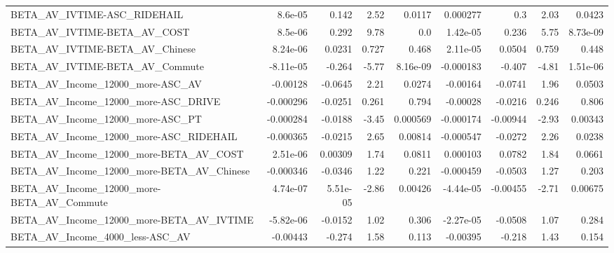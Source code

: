 \begin{tabular}{lrrrrrrrr}
BETA\_AV\_IVTIME-ASC\_RIDEHAIL                        &     8.6e-05 &        0.142 &     2.52 &   0.0117 &   0.000277 &         0.3 &         2.03 &        0.0423 \\
BETA\_AV\_IVTIME-BETA\_AV\_COST                        &     8.5e-06 &        0.292 &     9.78 &      0.0 &   1.42e-05 &       0.236 &         5.75 &      8.73e-09 \\
BETA\_AV\_IVTIME-BETA\_AV\_Chinese                     &    8.24e-06 &       0.0231 &    0.727 &    0.468 &   2.11e-05 &      0.0504 &        0.759 &         0.448 \\
BETA\_AV\_IVTIME-BETA\_AV\_Commute                     &   -8.11e-05 &       -0.264 &    -5.77 & 8.16e-09 &  -0.000183 &      -0.407 &        -4.81 &      1.51e-06 \\
BETA\_AV\_Income\_12000\_more-ASC\_AV                   &    -0.00128 &      -0.0645 &     2.21 &   0.0274 &   -0.00164 &     -0.0741 &         1.96 &        0.0503 \\
BETA\_AV\_Income\_12000\_more-ASC\_DRIVE                &   -0.000296 &      -0.0251 &    0.261 &    0.794 &   -0.00028 &     -0.0216 &        0.246 &         0.806 \\
BETA\_AV\_Income\_12000\_more-ASC\_PT                   &   -0.000284 &      -0.0188 &    -3.45 & 0.000569 &  -0.000174 &    -0.00944 &        -2.93 &       0.00343 \\
BETA\_AV\_Income\_12000\_more-ASC\_RIDEHAIL             &   -0.000365 &      -0.0215 &     2.65 &  0.00814 &  -0.000547 &     -0.0272 &         2.26 &        0.0238 \\
BETA\_AV\_Income\_12000\_more-BETA\_AV\_COST             &    2.51e-06 &      0.00309 &     1.74 &   0.0811 &   0.000103 &      0.0782 &         1.84 &        0.0661 \\
BETA\_AV\_Income\_12000\_more-BETA\_AV\_Chinese          &   -0.000346 &      -0.0346 &     1.22 &    0.221 &  -0.000459 &     -0.0503 &         1.27 &         0.203 \\
BETA\_AV\_Income\_12000\_more-BETA\_AV\_Commute          &    4.74e-07 &     5.51e-05 &    -2.86 &  0.00426 &  -4.44e-05 &    -0.00455 &        -2.71 &       0.00675 \\
BETA\_AV\_Income\_12000\_more-BETA\_AV\_IVTIME           &   -5.82e-06 &      -0.0152 &     1.02 &    0.306 &  -2.27e-05 &     -0.0508 &         1.07 &         0.284 \\
BETA\_AV\_Income\_4000\_less-ASC\_AV                    &    -0.00443 &       -0.274 &     1.58 &    0.113 &   -0.00395 &      -0.218 &         1.43 &         0.154 \\

\end{tabular}
